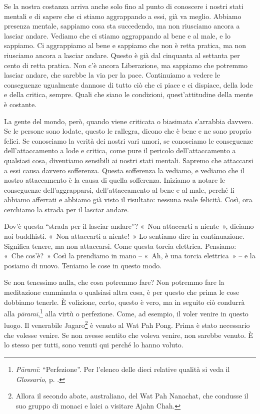Se la nostra costanza arriva anche solo fino al punto di conoscere i
nostri stati mentali e di sapere che ci stiamo aggrappando a essi, già
va meglio. Abbiamo presenza mentale, sappiamo cosa sta succedendo, ma
non riusciamo ancora a lasciar andare. Vediamo che ci stiamo aggrappando
al bene e al male, e lo sappiamo. Ci aggrappiamo al bene e sappiamo che
non è retta pratica, ma non riusciamo ancora a lasciar andare. Questo è
già dal cinquanta al settanta per cento di retta pratica. Non c'è ancora
Liberazione, ma sappiamo che potremmo lasciar andare, che sarebbe la via
per la pace. Continuiamo a vedere le conseguenze ugualmente dannose di
tutto ciò che ci piace e ci dispiace, della lode e della critica,
sempre. Quali che siano le condizioni, quest'attitudine della mente è
costante.

La gente del mondo, però, quando viene criticata o biasimata s'arrabbia
davvero. Se le persone sono lodate, questo le rallegra, dicono che è
bene e ne sono proprio felici. Se conosciamo la verità dei nostri vari
umori, se conosciamo le conseguenze dell'attaccamento a lode e critica,
come pure il pericolo dell'attaccamento a qualsiasi cosa, diventiamo
sensibili ai nostri stati mentali. Sapremo che attaccarsi a essi causa
davvero sofferenza. Questa sofferenza la vediamo, e vediamo che il
nostro attaccamento è la causa di quella sofferenza. Iniziamo a notare
le conseguenze dell'aggrapparsi, dell'attaccamento al bene e al male,
perché li abbiamo afferrati e abbiamo già visto il risultato: nessuna
reale felicità. Così, ora cerchiamo la strada per il lasciar andare.

Dov'è questa ``strada per il lasciar andare''? «~Non attaccarti a
niente~», diciamo noi buddhisti. «~Non attaccarti a niente!~» Lo
sentiamo dire in continuazione. Significa tenere, ma non attaccarsi.
Come questa torcia elettrica. Pensiamo: «~Che cos'è?~» Così la prendiamo
in mano -- «~Ah, è una torcia elettrica~» -- e la posiamo di nuovo.
Teniamo le cose in questo modo.

Se non tenessimo nulla, che cosa potremmo fare? Non potremmo fare la
meditazione camminata o qualsiasi altra cosa, è per questo che prima le
cose dobbiamo tenerle. È volizione, certo, questo è vero, ma in seguito
ciò condurrà alla \emph{pāramī},\footnote{\emph{Pāramī}: ``Perfezione''.
  Per l'elenco delle dieci relative qualità si veda il \emph{Glossario}, p. \pageref{glossary-parami}.}
alla virtù o perfezione. Come, ad esempio, il voler venire in questo
luogo. Il venerabile Jagaro\footnote{Allora il secondo abate,
  australiano, del Wat Pah Nanachat, che condusse il suo gruppo di
  monaci e laici a visitare Ajahn Chah.} è venuto al Wat Pah Pong. Prima
è stato necessario che volesse venire. Se non avesse sentito che voleva
venire, non sarebbe venuto. È lo stesso per tutti, sono venuti qui
perché lo hanno voluto.

